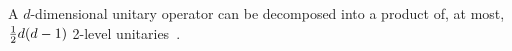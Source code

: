 
\begin{center}
\end{center}




A $d$-dimensional unitary operator can be decomposed into a product of, at most, $\tfrac{1}{2} d(d-1)$ 2-level unitaries~\cite{Reck1994a,???,???}.

